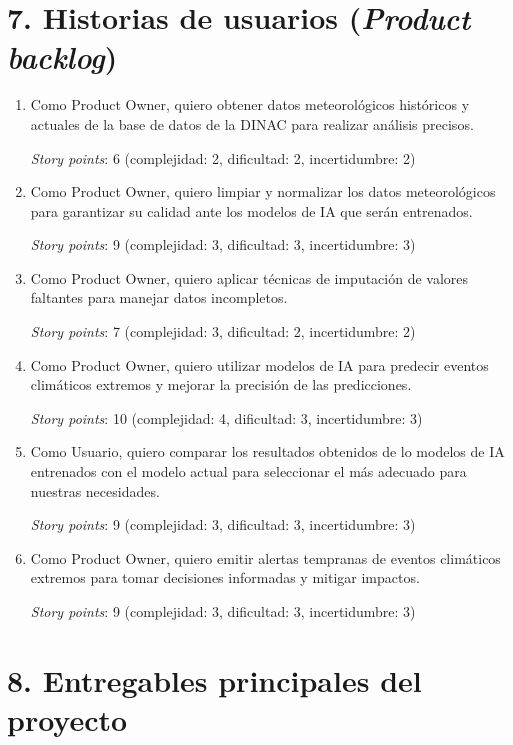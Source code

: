 \documentclass[
11pt, %
codirector, %
]{charter}
\begin{document}
\section{7. Historias de usuarios (\textit{Product backlog})}
\label{sec:backlog}

\begin{enumerate}
\item Como Product Owner, quiero obtener datos meteorológicos históricos y actuales de la base de datos de la DINAC para realizar análisis precisos.

\textit{Story points}: 6 (complejidad: 2, dificultad: 2, incertidumbre: 2)

\item Como Product Owner, quiero limpiar y normalizar los datos meteorológicos para garantizar su calidad ante los modelos de IA que serán entrenados.

\textit{Story points}: 9 (complejidad: 3, dificultad: 3, incertidumbre: 3)

\item Como Product Owner, quiero aplicar técnicas de imputación de valores faltantes para manejar datos incompletos.

\textit{Story points}: 7 (complejidad: 3, dificultad: 2, incertidumbre: 2)

\item Como Product Owner, quiero utilizar modelos de IA para predecir eventos climáticos extremos y mejorar la precisión de las predicciones.

\textit{Story points}: 10 (complejidad: 4, dificultad: 3, incertidumbre: 3)

\item Como Usuario, quiero comparar los resultados obtenidos de lo modelos de IA entrenados con el modelo actual para seleccionar el más adecuado para nuestras necesidades.

\textit{Story points}: 9 (complejidad: 3, dificultad: 3, incertidumbre: 3)

\item Como Product Owner, quiero emitir alertas tempranas de eventos climáticos extremos para tomar decisiones informadas y mitigar impactos.

\textit{Story points}: 9 (complejidad: 3, dificultad: 3, incertidumbre: 3)
\end{enumerate}

\section{8. Entregables principales del proyecto}
\label{sec:entregables}
\end{document}
